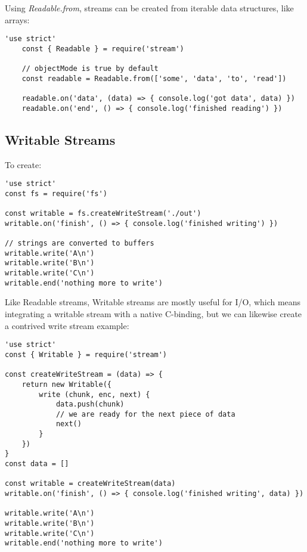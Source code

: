 \documentclass{scrartcl}
\begin{document}
Using \textit{Readable.from}, streams can be created from iterable data structures, like arrays:

\begin{lstlisting}[style=ES6]
    'use strict'
    const { Readable } = require('stream')

    // objectMode is true by default
    const readable = Readable.from(['some', 'data', 'to', 'read'])

    readable.on('data', (data) => { console.log('got data', data) })
    readable.on('end', () => { console.log('finished reading') })

\end{lstlisting}

\subsection{Writable Streams}

To create:

\begin{lstlisting}[style=ES6]
'use strict'
const fs = require('fs')

const writable = fs.createWriteStream('./out')
writable.on('finish', () => { console.log('finished writing') })

// strings are converted to buffers
writable.write('A\n')
writable.write('B\n')
writable.write('C\n')
writable.end('nothing more to write')
\end{lstlisting}

Like Readable streams, Writable streams are mostly useful for I/O, which means integrating a writable stream with a native C-binding, but we can likewise create a contrived write stream example:

\begin{lstlisting}[style=ES6]
'use strict'
const { Writable } = require('stream')

const createWriteStream = (data) => {
    return new Writable({
        write (chunk, enc, next) {
            data.push(chunk)
            // we are ready for the next piece of data
            next()
        }
    })
}
const data = []

const writable = createWriteStream(data)
writable.on('finish', () => { console.log('finished writing', data) })

writable.write('A\n')
writable.write('B\n')
writable.write('C\n')
writable.end('nothing more to write')

\end{lstlisting}
\end{document}
